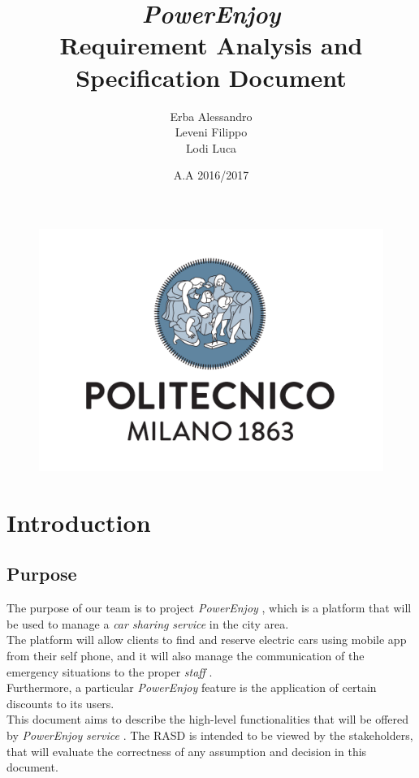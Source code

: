 \documentclass[english]{article}
\newcommand{\carsharing}{\textit {car sharing }}
\newcommand{\powerenjoy}{\textit{PowerEnjoy }}
\newcommand{\staff}{\textit{staff }}
\newcommand{\service}{\textit{service }}
\begin{document}
\begin{figure}
	\centering
	\includegraphics[scale=0.5]{logo.pdf} 
\end{figure}


\title{\powerenjoy\\
 Requirement Analysis and Specification Document\\
}

\date{A.A 2016/2017}

\author{Erba Alessandro\\
 Leveni Filippo\\
 Lodi Luca}

\maketitle
\pagebreak{}

\tableofcontents{} \pagebreak{}

\section{Introduction}
	\subsection{Purpose }
	
		The purpose of our team is to project \powerenjoy, which is  a platform that will be used to manage a \carsharing \service 
 		 in the city area.\\
 		The platform will allow clients to find and reserve electric cars using mobile app from their self phone, and it will 	also manage the communication of the emergency situations to the proper \staff.\\
  		Furthermore, a particular \powerenjoy feature is the application of certain discounts to its users.\\
 		 \tab \tab This document aims to describe the high-level functionalities that will be offered by \powerenjoy \service. The RASD is intended to be viewed by the stakeholders, that will evaluate the correctness of any assumption and decision in this document.
  
\end{document}
